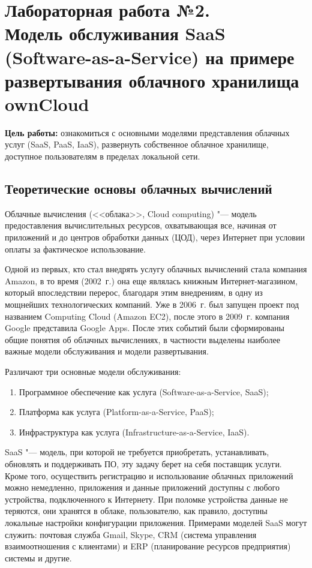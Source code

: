 \section[Лабораторная работа №2]{Лабораторная работа №2. \\
Модель обслуживания SaaS (Software-as-a-Service) на примере развертывания облачного хранилища ownCloud}

\textbf{Цель работы:} ознакомиться с основными моделями представления облачных услуг (SaaS, PaaS, IaaS), развернуть собственное облачное хранилище, доступное пользователям в пределах локальной сети.

\subsection{Теоретические основы облачных вычислений}

Облачные вычисления (<<облака>>, Cloud computing) "--- модель предоставления вычислительных ресурсов, охватывающая все, начиная от приложений и до центров обработки данных (ЦОД), через Интернет при условии оплаты за фактическое использование. \cite{cloud}

Одной из первых, кто стал внедрять услугу облачных вычислений стала компания Amazon, в то время (2002~г.) она еще являлась книжным Интернет-магазином, который впоследствии перерос, благодаря этим внедрениям, в одну из мощнейших технологических компаний. 
Уже в 2006~г. был запущен проект под названием Computing Cloud (Amazon EC2), после этого в 2009~г. компания Google представила Google Apps.
После этих событий были сформированы общие понятия об облачных вычислениях, в частности выделены наиболее важные модели обслуживания и модели развертывания.

Различают три основные модели обслуживания:
\begin{enumerate}
    \item Программное обеспечение как услуга (Software-as-a-Service, SaaS);
    \item Платформа как услуга (Platform-as-a-Service, PaaS);
    \item Инфраструктура как услуга (Infrastructure-as-a-Service, IaaS).
\end{enumerate}

SaaS "--- модель, при которой не требуется приобретать, устанавливать, обновлять и поддерживать ПО, эту задачу берет на себя поставщик услуги.
Кроме того, осуществить регистрацию и использование облачных приложений можно немедленно, приложения и данные приложений доступны с любого устройства, подключенного к Интернету.
При поломке устройства данные не теряются, они хранятся в облаке, пользователю, как правило, доступны локальные настройки конфигурации приложения. 
Примерами моделей SaaS могут служить: почтовая служба Gmail, Skype, CRM (система управления взаимоотношения с клиентами) и ERP (планирование ресурсов предприятия) системы и другие.

